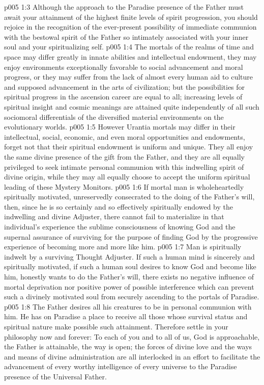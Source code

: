 \vs p005 1:3 \pc Although the approach to the Paradise presence of the Father must await your attainment of the highest finite levels of spirit progression, you should rejoice in the recognition of the ever\hyp{}present possibility of immediate communion with the bestowal spirit of the Father so intimately associated with your inner soul and your spiritualizing self.
\vs p005 1:4 The mortals of the realms of time and space may differ greatly in innate abilities and intellectual endowment, they may enjoy environments exceptionally favorable to social advancement and moral progress, or they may suffer from the lack of almost every human aid to culture and supposed advancement in the arts of civilization; but the possibilities for spiritual progress in the ascension career are equal to all; increasing levels of spiritual insight and cosmic meanings are attained quite independently of all such sociomoral differentials of the diversified material environments on the evolutionary worlds.
\vs p005 1:5 However Urantia mortals may differ in their intellectual, social, economic, and even moral opportunities and endowments, forget not that their spiritual endowment is uniform and unique. They all enjoy the same divine presence of the gift from the Father, and they are all equally privileged to seek intimate personal communion with this indwelling spirit of divine origin, while they may all equally choose to accept the uniform spiritual leading of these Mystery Monitors.
\vs p005 1:6 \pc If mortal man is wholeheartedly spiritually motivated, unreservedly consecrated to the doing of the Father’s will, then, since he is so certainly and so effectively spiritually endowed by the indwelling and divine Adjuster, there cannot fail to materialize in that individual’s experience the sublime consciousness of knowing God and the supernal assurance of surviving for the purpose of finding God by the progressive experience of becoming more and more like him.
\vs p005 1:7 Man is spiritually indwelt by a surviving Thought Adjuster. If such a human mind is sincerely and spiritually motivated, if such a human soul desires to know God and become like him, honestly wants to do the Father’s will, there exists no negative influence of mortal deprivation nor positive power of possible interference which can prevent such a divinely motivated soul from securely ascending to the portals of Paradise.
\vs p005 1:8 The Father desires all his creatures to be in personal communion with him. He has on Paradise a place to receive all those whose survival status and spiritual nature make possible such attainment. Therefore settle in your philosophy now and forever: To each of you and to all of us, God is approachable, the Father is attainable, the way is open; the forces of divine love and the ways and means of divine administration are all interlocked in an effort to facilitate the advancement of every worthy intelligence of every universe to the Paradise presence of the Universal Father.
